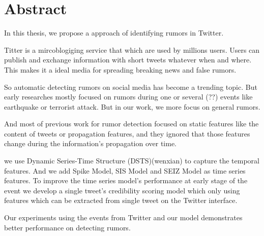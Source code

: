 \chapter{Abstract}
In this thesis, we propose a approach of identifying rumors in Twitter. 

Titter is a mircoblogiging service that which are used by millions users. Users can publish and exchange information with short tweets whatever when and where. This makes it a ideal media for spreading breaking news and false rumors.  

So automatic detecting rumors on social media has become a trending topic. But early researches mostly focused on rumors during one or several (??) events like earthquake or terrorist attack. But in our work, we more focus on general rumors.

And most of previous work for rumor detection focused on static features like the content of tweets or propagation features, and they ignored that those features change during the information's propagation over time.

we use Dynamic Series-Time Structure (DSTS)(wenxian) to capture the temporal features. And we add Spike Model, SIS Model and SEIZ Model as time series features. To improve the time series model's performance at early stage of the event we develop a single tweet's credibility scoring model which only using features which can be extracted from single tweet on the Twitter interface.


 Our experiments using the events from Twitter and our model demonstrates better performance on detecting rumors.



